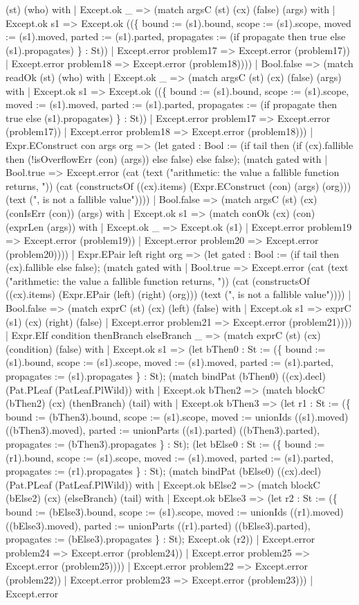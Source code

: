 \documentclass[11pt]{article}
\begin{document}
(st) (who) with | Except.ok \_ => (match argsC (st) (cx) (false) (args) with | Except.ok s1 => Except.ok ((\{ bound := (s1).bound, scope := (s1).scope, moved := (s1).moved, parted := (s1).parted, propagates := (if propagate then true else (s1).propagates) \} : St)) | Except.error problem17 => Except.error (problem17)) | Except.error problem18 => Except.error (problem18)))) | Bool.false => (match readOk (st) (who) with | Except.ok \_ => (match argsC (st) (cx) (false) (args) with | Except.ok s1 => Except.ok ((\{ bound := (s1).bound, scope := (s1).scope, moved := (s1).moved, parted := (s1).parted, propagates := (if propagate then true else (s1).propagates) \} : St)) | Except.error problem17 => Except.error (problem17)) | Except.error problem18 => Except.error (problem18))) | Expr.EConstruct con args org => (let gated : Bool := (if tail then (if (cx).fallible then (!isOverflowErr (con) (args)) else false) else false); (match gated with | Bool.true => Except.error (cat (text ("arithmetic: the value a fallible function returns, ")) (cat (constructsOf ((cx).items) (Expr.EConstruct (con) (args) (org))) (text (", is not a fallible value")))) | Bool.false => (match argsC (st) (cx) (conIsErr (con)) (args) with | Except.ok s1 => (match conOk (cx) (con) (exprLen (args)) with | Except.ok \_ => Except.ok (s1) | Except.error problem19 => Except.error (problem19)) | Except.error problem20 => Except.error (problem20)))) | Expr.EPair left right org => (let gated : Bool := (if tail then (cx).fallible else false); (match gated with | Bool.true => Except.error (cat (text ("arithmetic: the value a fallible function returns, ")) (cat (constructsOf ((cx).items) (Expr.EPair (left) (right) (org))) (text (", is not a fallible value")))) | Bool.false => (match exprC (st) (cx) (left) (false) with | Except.ok s1 => exprC (s1) (cx) (right) (false) | Except.error problem21 => Except.error (problem21)))) | Expr.EIf condition thenBranch elseBranch \_ => (match exprC (st) (cx) (condition) (false) with | Except.ok s1 => (let bThen0 : St := (\{ bound := (s1).bound, scope := (s1).scope, moved := (s1).moved, parted := (s1).parted, propagates := (s1).propagates \} : St); (match bindPat (bThen0) ((cx).decl) (Pat.PLeaf (PatLeaf.PlWild)) with | Except.ok bThen2 => (match blockC (bThen2) (cx) (thenBranch) (tail) with | Except.ok bThen3 => (let r1 : St := (\{ bound := (bThen3).bound, scope := (s1).scope, moved := unionIds ((s1).moved) ((bThen3).moved), parted := unionParts ((s1).parted) ((bThen3).parted), propagates := (bThen3).propagates \} : St); (let bElse0 : St := (\{ bound := (r1).bound, scope := (s1).scope, moved := (s1).moved, parted := (s1).parted, propagates := (r1).propagates \} : St); (match bindPat (bElse0) ((cx).decl) (Pat.PLeaf (PatLeaf.PlWild)) with | Except.ok bElse2 => (match blockC (bElse2) (cx) (elseBranch) (tail) with | Except.ok bElse3 => (let r2 : St := (\{ bound := (bElse3).bound, scope := (s1).scope, moved := unionIds ((r1).moved) ((bElse3).moved), parted := unionParts ((r1).parted) ((bElse3).parted), propagates := (bElse3).propagates \} : St); Except.ok (r2)) | Except.error problem24 => Except.error (problem24)) | Except.error problem25 => Except.error (problem25)))) | Except.error problem22 => Except.error (problem22)) | Except.error problem23 => Except.error (problem23))) | Except.error 
\end{document}
